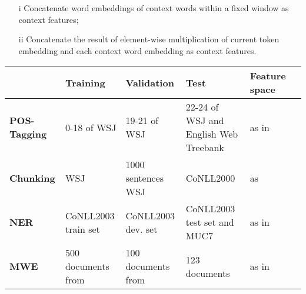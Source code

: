 \documentclass[11pt]{article}
\begin{document}
\begin{small}
\begin{itemize}
\item[i] Concatenate word embeddings of context words within a fixed window as context features; 
\item[ii] Concatenate the result of element-wise multiplication of current token embedding and each context word embedding as context features. 
\end{itemize}
\end{small}



\begin{table*}
\begin{small}
\begin{tabular}{lllp{3cm}ll}
			& Training & Validation & Test & Feature space \\ \hline
\textbf{POS-Tagging} & 0-18 of WSJ & 19-21 of WSJ & 22-24 of WSJ and English Web Treebank & as in~\cite{collobert2011natural} \\
\textbf{Chunking} & WSJ & 1000 sentences WSJ & CoNLL2000 & as~\cite{turian2010word}\\
\textbf{NER} & CoNLL2003 train set & CoNLL2003 dev. set & CoNLL2003 test set and MUC7 & as in~\cite{turian2010word} \\
\textbf{MWE} & 500 documents from & 100 documents from & 123 documents & as in~\cite{mwecorpus}\\
\hline
\end{tabular}
\end{small}
\end{table*}



\end{document}
